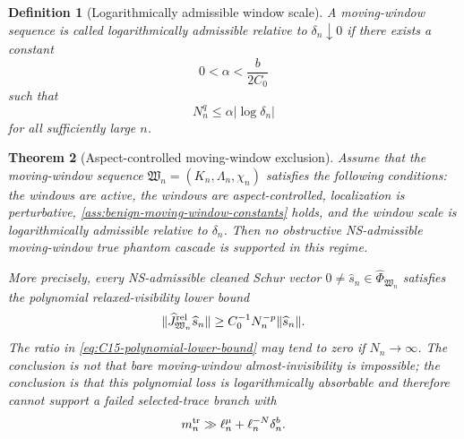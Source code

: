 \documentclass[11pt]{article}
\numberwithin{equation}{section}
\newtheorem{theorem}{Theorem}[section]
\newtheorem{definition}[theorem]{Definition}
\begin{document}
\begin{definition}[Logarithmically admissible window scale]\label{def:log-admissible-window-scale}
A moving-window sequence is called logarithmically admissible relative to \(\delta_n\downarrow0\) if there exists a constant
\[
        0<\alpha<\frac{b}{2C_0}
\]
such that
\[
        N_n^q\le \alpha |\log\delta_n|
\]
for all sufficiently large \(n\).
\end{definition}

\begin{theorem}[Aspect-controlled moving-window exclusion]\label{thm:aspect-controlled-moving-window-exclusion}
Assume that the moving-window sequence \(\mathfrak W_n=(K_n,\Lambda_n,\chi_n)\) satisfies the following conditions: the windows are active, the windows are aspect-controlled, localization is perturbative, \cref{ass:benign-moving-window-constants} holds, and the window scale is logarithmically admissible relative to \(\delta_n\).  Then no \emph{obstructive} NS-admissible moving-window true phantom cascade is supported in this regime.

More precisely, every NS-admissible cleaned Schur vector \(0\neq\widehat s_n\in\widehat\Phi_{\mathfrak W_n}\) satisfies the polynomial relaxed-visibility lower bound
\begin{equation}\label{eq:C15-polynomial-lower-bound}
        \|\widehat J_{\mathfrak W_n}^{\rm rel}\widehat s_n\|
        \ge C_0^{-1}N_n^{-p}\|\widehat s_n\|.
\end{equation}
The ratio in \eqref{eq:C15-polynomial-lower-bound} may tend to zero if \(N_n\to\infty\).  The conclusion is not that bare moving-window almost-invisibility is impossible; the conclusion is that this polynomial loss is logarithmically absorbable and therefore cannot support a failed selected-trace branch with
\[
        m_n^{\rm tr}\gg \ell_n^\mu+\ell_n^{-N}\delta_n^b.
\]
\end{theorem}
\end{document}
